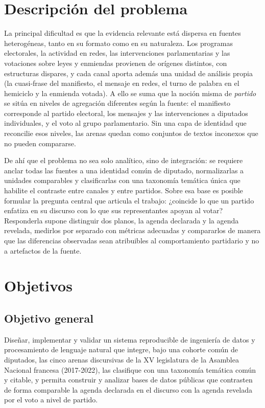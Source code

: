 \section{Descripción del problema}
\label{sec:problema}

La principal dificultad es que la evidencia relevante está dispersa en fuentes
heterogéneas, tanto en su formato como en su naturaleza. Los programas
electorales, la actividad en redes, las intervenciones parlamentarias y las
votaciones sobre leyes y enmiendas provienen de orígenes distintos, con
estructuras dispares, y cada canal aporta además una unidad de análisis propia
(la cuasi-frase del manifiesto, el mensaje en redes, el turno de palabra en el
hemiciclo y la enmienda votada). A ello se suma que la noción misma de
\emph{partido} se sitúa en niveles de agregación diferentes según la fuente: el
manifiesto corresponde al partido electoral, los mensajes y las intervenciones a
diputados individuales, y el voto al grupo parlamentario. Sin una capa de
identidad que reconcilie esos niveles, las arenas quedan como conjuntos de textos
inconexos que no pueden compararse.

De ahí que el problema no sea solo analítico, sino de integración: se requiere
anclar todas las fuentes a una identidad común de diputado, normalizarlas a
unidades comparables y clasificarlas con una taxonomía temática única que
habilite el contraste entre canales y entre partidos. Sobre esa base es posible
formular la pregunta central que articula el trabajo: ¿coincide lo que un partido
enfatiza en su discurso con lo que sus representantes apoyan al votar? Responderla
supone distinguir dos planos, la agenda declarada y la agenda revelada, medirlos
por separado con métricas adecuadas y compararlos de manera que las diferencias
observadas sean atribuibles al comportamiento partidario y no a artefactos de la
fuente.

\section{Objetivos}
\label{sec:objetivos}

\subsection{Objetivo general}
\label{sec:objetivo-general}

Diseñar, implementar y validar un sistema reproducible de ingeniería de datos y
procesamiento de lenguaje natural que integre, bajo una cohorte común de
diputados, las cinco arenas discursivas de la XV legislatura de la Asamblea
Nacional francesa (2017-2022), las clasifique con una taxonomía temática común y
citable, y permita construir y analizar bases de datos públicas que contrasten de
forma comparable la agenda declarada en el discurso con la agenda revelada por el
voto a nivel de partido.

